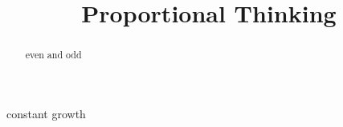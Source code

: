 \documentclass{ximera}
\title{Proportional Thinking}
\begin{document}
\begin{abstract}
even and odd
\end{abstract}
\maketitle



constant growth
\end{document}
